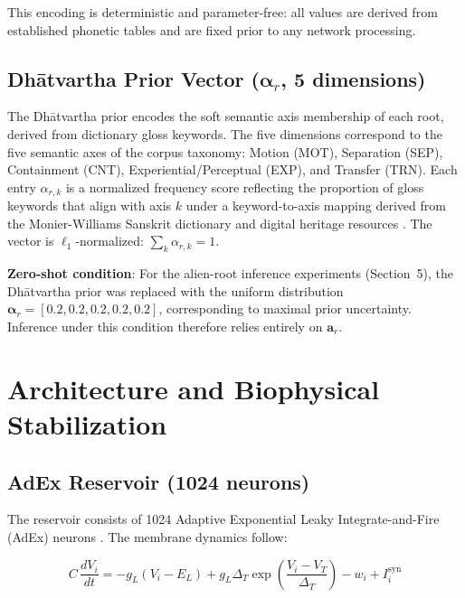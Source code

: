 \documentclass{article}
\begin{document}
This encoding is deterministic and parameter-free: all values are derived from
established phonetic tables and are fixed prior to any network processing.

\subsection{Dhātvartha Prior Vector ($\boldsymbol{\alpha}_r$, 5 dimensions)}

The Dhātvartha prior encodes the soft semantic axis membership of each root, derived
from dictionary gloss keywords. The five dimensions correspond to the five semantic
axes of the corpus taxonomy: Motion (MOT), Separation (SEP), Containment (CNT),
Experiential/Perceptual (EXP), and Transfer (TRN). Each entry $\alpha_{r,k}$ is a
normalized frequency score reflecting the proportion of gloss keywords that align with
axis $k$ under a keyword-to-axis mapping derived from the Monier-Williams Sanskrit
dictionary \citep{monierw1899} and digital heritage resources \citep{huet2004,sandhan2023}. The vector is $\ell_1$-normalized: $\sum_k \alpha_{r,k} = 1$.

\textbf{Zero-shot condition}: For the alien-root inference experiments (Section~5), the
Dhātvartha prior was replaced with the uniform distribution $\boldsymbol{\alpha}_r =
[0.2, 0.2, 0.2, 0.2, 0.2]$, corresponding to maximal prior uncertainty. Inference under
this condition therefore relies entirely on $\mathbf{a}_r$.

\section{Architecture and Biophysical Stabilization}

\subsection{AdEx Reservoir (1024 neurons)}

The reservoir consists of 1024 Adaptive Exponential Leaky Integrate-and-Fire (AdEx)
neurons \citep{brette2005adex,brette2005}. The membrane dynamics follow:

\begin{equation}
  C\,\frac{dV_i}{dt} = -g_L(V_i - E_L) + g_L \Delta_T
    \exp\!\left(\frac{V_i - V_T}{\Delta_T}\right)
    - w_i + I_i^{\text{syn}}
  \label{eq:adex}
\end{equation}
\end{document}
